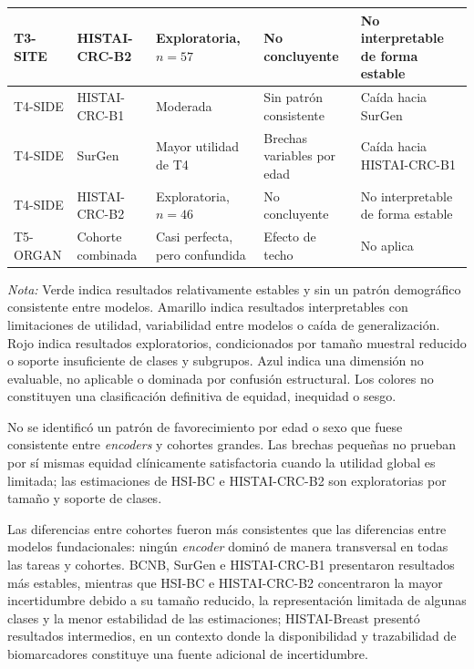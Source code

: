 \begin{table}[htbp]
{\begin{tabular}{l l p{3.2cm} p{3.6cm} p{3.4cm}}
T3-SITE &
HISTAI-CRC-B2 &
\cellcolor{red!25}Exploratoria, $n=57$ &
\cellcolor{red!25}No concluyente &
\cellcolor{red!25}No interpretable de forma estable \\
\midrule

T4-SIDE &
HISTAI-CRC-B1 &
\cellcolor{yellow!25}Moderada &
\cellcolor{green!20}Sin patrón consistente &
\cellcolor{yellow!25}Caída hacia SurGen \\

T4-SIDE &
SurGen &
\cellcolor{green!20}Mayor utilidad de T4 &
\cellcolor{yellow!25}Brechas variables por edad &
\cellcolor{yellow!25}Caída hacia HISTAI-CRC-B1 \\

T4-SIDE &
HISTAI-CRC-B2 &
\cellcolor{red!25}Exploratoria, $n=46$ &
\cellcolor{red!25}No concluyente &
\cellcolor{red!25}No interpretable de forma estable \\
\midrule

T5-ORGAN &
Cohorte combinada &
\cellcolor{blue!20}Casi perfecta, pero confundida &
\cellcolor{blue!20}Efecto de techo &
\cellcolor{blue!20}No aplica \\
\bottomrule
\end{tabular}%
}

\medskip
\footnotesize
\parbox{0.97\textwidth}{\textit{Nota:} Verde indica resultados relativamente estables y sin un patrón demográfico consistente entre modelos. Amarillo indica resultados interpretables con limitaciones de utilidad, variabilidad entre modelos o caída de generalización. Rojo indica resultados exploratorios, condicionados por tamaño muestral reducido o soporte insuficiente de clases y subgrupos. Azul indica una dimensión no evaluable, no aplicable o dominada por confusión estructural. Los colores no constituyen una clasificación definitiva de equidad, inequidad o sesgo.}
\end{table}

No se identificó un patrón de favorecimiento por edad o sexo que fuese consistente entre \textit{encoders} y cohortes grandes. Las brechas pequeñas no prueban por sí mismas equidad clínicamente satisfactoria cuando la utilidad global es limitada; las estimaciones de HSI-BC e HISTAI-CRC-B2 son exploratorias por tamaño y soporte de clases.

Las diferencias entre cohortes fueron más consistentes que las diferencias entre modelos fundacionales: ningún \textit{encoder} dominó de manera transversal en todas las tareas y cohortes. BCNB, SurGen e HISTAI-CRC-B1 presentaron resultados más estables, mientras que HSI-BC e HISTAI-CRC-B2 concentraron la mayor incertidumbre debido a su tamaño reducido, la representación limitada de algunas clases y la menor estabilidad de las estimaciones; HISTAI-Breast presentó resultados intermedios, en un contexto donde la disponibilidad y trazabilidad de biomarcadores constituye una fuente adicional de incertidumbre.

